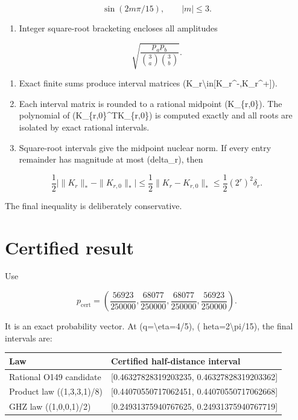 \documentclass[11pt,a4paper,openany]{report}
\begin{document}
\[
\sin(2m\pi/15),\qquad |m|\le3.
\]

\begin{enumerate}
\item 
Integer square-root bracketing encloses all amplitudes

\end{enumerate}

\[
\sqrt{\frac{p_ap_b}{\binom3a\binom3b}}.
\]

\begin{enumerate}
\item 
Exact finite sums produce interval matrices (K\_r\textbackslash{}in[K\_r\textasciicircum{}-,K\_r\textasciicircum{}+]).

\item 
Each interval matrix is rounded to a rational midpoint (K\_\{r,0\}). The polynomial of (K\_\{r,0\}\textasciicircum{}TK\_\{r,0\}) is computed exactly and all roots are isolated by exact rational intervals.

\item 
Square-root intervals give the midpoint nuclear norm. If every entry remainder has magnitude at most (delta\_r), then

\end{enumerate}

\[
\frac12\big|\|K_r\|_*-\|K_{r,0}\|_*\big|
\le\frac12\|K_r-K_{r,0}\|_*
\le\frac12(2^r)^2\delta_r.
\]

The final inequality is deliberately conservative.

\section{Certified result}

Use

\[
p_{\mathrm{cert}}
=\left(\frac{56923}{250000},
\frac{68077}{250000},
\frac{68077}{250000},
\frac{56923}{250000}\right).
\]

It is an exact probability vector. At (q=\textbackslash{}eta=4/\allowbreak{}5), (	heta=2\textbackslash{}pi/\allowbreak{}15), the final intervals are:

\begin{center}
\begingroup\small
\setlength{\tabcolsep}{2.5pt}
\renewcommand{\arraystretch}{1.16}
\begin{longtable}{@{}p{}p{}@{}}
\toprule
\textbf{Law} & \textbf{Certified half-distance interval} \\
\midrule
\endhead
Rational O149 candidate & [0.46327828319203235, 0.46327828319203362] \\
Product law ((1,3,3,1)/\allowbreak{}8) & [0.44070550717062451, 0.44070550717062668] \\
GHZ law ((1,0,0,1)/\allowbreak{}2) & [0.24931375940767625, 0.24931375940767719] \\
\bottomrule
\end{longtable}
\endgroup
\end{center}
\end{document}
